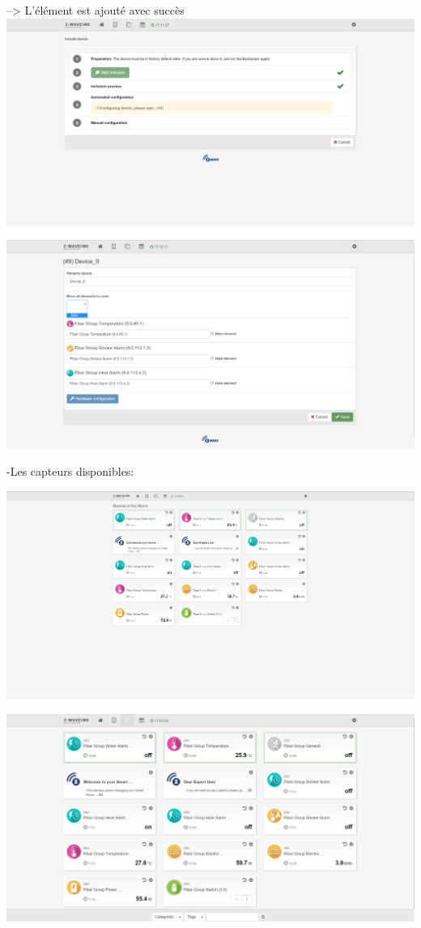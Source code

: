 --> L'élément est ajouté avec succès
\includegraphics[scale=0.5]{./latex/Images/png/add3_zwaveme.png}\newline

\includegraphics[scale=0.5]{./latex/Images/png/add4_zwaveme.png}\newline


-Les capteurs disponibles:

\includegraphics[scale=0.5]{./latex/Images/png/ecranCapteur.png}\newline

\includegraphics[scale=0.5]{./latex/Images/png/device_zwaveme.png}\newline


